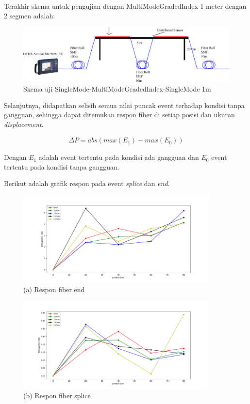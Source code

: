 \documentclass[12pt]{article}
\begin{document}
	\newpage
	Terakhir skema untuk pengujian dengan MultiModeGradedIndex 1 meter dengan 2 segmen adalah:
	
	\begin{figure}[!ht]
		\centering
		\captionsetup{justification=centering}
		\includegraphics[width=0.7\linewidth]{images/Bab_4/uji2_1m}
		\caption[Trace SMF-SMF]{\small{Skema uji SingleMode-MultiModeGradedIndex-SingleMode 1m}}
	\end{figure}
	
	Selanjutnya, didapatkan selisih semua nilai puncak event terhadap kondisi tanpa gangguan,
	sehingga dapat ditemukan respon fiber di setiap posisi dan ukuran \textit{displacement}.
	
	\begin{align}
		\Delta P = abs(max(E_1) - max(E_0))
	\end{align}
	
	Dengan $E_1$ adalah event tertentu pada kondisi ada gangguan dan $E_0$ event tertentu pada kondisi tanpa gangguan.
	
	Berikut adalah grafik respon pada event \textit{splice} dan \textit{end}.
	
	\begin{figure}[!ht]
		\centering
		\captionsetup{justification=centering}
		\includegraphics[width=0.9\textwidth]{images/Bab_4/Bab_4_5f1}	
		\caption{\small{(a) Respon fiber end}}
	\end{figure}
	
	\begin{figure}[!ht]
		\centering
		\captionsetup{justification=centering}
		\includegraphics[width=0.9\textwidth]{images/Bab_4/Bab_4_5f2}	
		\caption{\small{(b) Respon fiber splice}}
	\end{figure}
\end{document}
